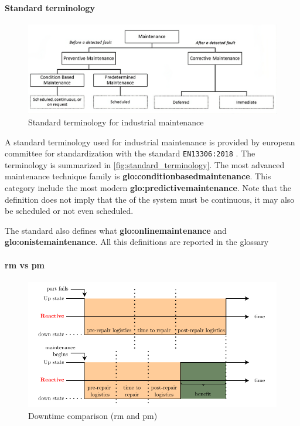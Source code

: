 \paragraph{Standard terminology}
\begin{figure}
    \centering
    \includegraphics[width=\textwidth]{images/StateArt/EN13306.png}
    \caption{Standard terminology for industrial maintenance \cite{rastegari2017condition}}
    \label{fig:standard_terminology}
\end{figure}

A standard terminology used for industrial maintenance is provided by european committee for standardization with the standard \texttt{EN13306:2018} \cite{EN13306:2018}. The terminology is summarized in \autoref{fig:standard_terminology}. The most advanced maintenance technique family is \textbf{\gls{glo:conditionbasedmaintenance}}. This category include the most modern \textbf{\gls{glo:predictivemaintenance}}. Note that the definition does not imply that the  of the system must be continuous, it may also be scheduled or not even scheduled.

The standard also defines what \textbf{\gls{glo:onlinemaintenance}} and \textbf{\gls{glo:onistemaintenance}}. All this definitions are reported in the {glossary}


\paragraph{\gls{rm} vs \gls{pm}}
\begin{figure}
    \centering
    \includegraphics[scale=0.9]{images/StateArt/lost_opportunities.pdf}
    \caption{Downtime comparison (\gls{rm} and \gls{pm})}
    \label{fig:lost_opportunities}
\end{figure}

